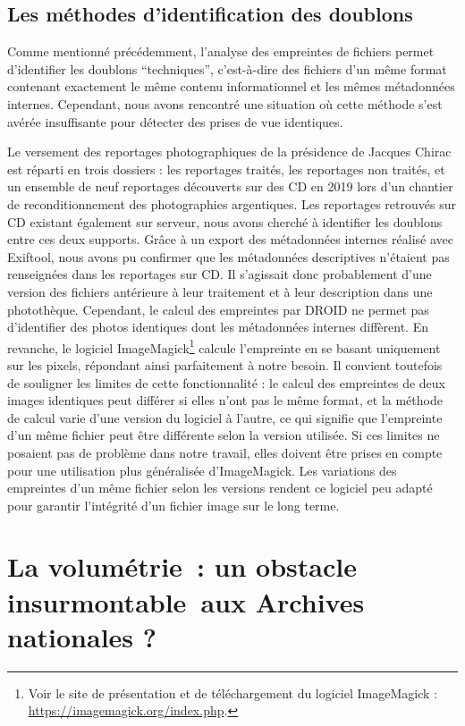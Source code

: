 \subsection*{Les méthodes d’identification des doublons}

Comme mentionné précédemment, l'analyse des empreintes de fichiers permet d'identifier les doublons \enquote{techniques}, c'est-à-dire des fichiers d'un même format contenant exactement le même contenu informationnel et les mêmes métadonnées internes. Cependant, nous avons rencontré une situation où cette méthode s'est avérée insuffisante pour détecter des prises de vue identiques.

Le versement des reportages photographiques de la présidence de Jacques Chirac est réparti en trois dossiers : les reportages traités, les reportages non traités, et un ensemble de neuf reportages découverts sur des CD en 2019 lors d'un chantier de reconditionnement des photographies argentiques. Les reportages retrouvés sur CD existant également sur serveur, nous avons cherché à identifier les doublons entre ces deux supports. Grâce à un export des métadonnées internes réalisé avec Exiftool, nous avons pu confirmer que les métadonnées descriptives n'étaient pas renseignées dans les reportages sur CD. Il s'agissait donc probablement d'une version des fichiers antérieure à leur traitement et à leur description dans une photothèque. Cependant, le calcul des empreintes par DROID ne permet pas d'identifier des photos identiques dont les métadonnées internes diffèrent. En revanche, le logiciel ImageMagick\footnote{Voir le site de présentation et de téléchargement du logiciel ImageMagick : \url{https://imagemagick.org/index.php}.} calcule l'empreinte en se basant uniquement sur les pixels, répondant ainsi parfaitement à notre besoin. Il convient toutefois de souligner les limites de cette fonctionnalité : le calcul des empreintes de deux images identiques peut différer si elles n'ont pas le même format, et la méthode de calcul varie d'une version du logiciel à l'autre, ce qui signifie que l'empreinte d'un même fichier peut être différente selon la version utilisée. Si ces limites ne posaient pas de problème dans notre travail, elles doivent être prises en compte pour une utilisation plus généralisée d'ImageMagick. Les variations des empreintes d'un même fichier selon les versions rendent ce logiciel peu adapté pour garantir l'intégrité d'un fichier image sur le long terme.

\section{La volumétrie : un obstacle insurmontable aux Archives nationales ?}

